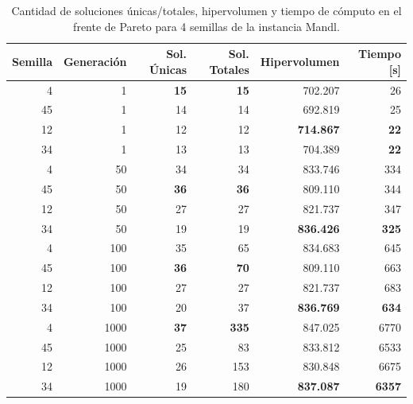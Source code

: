 \begin{table}[!htb]
\centering
\begin{tabular}{|r|r|r|r|r|r|}
\hline
Semilla & Generación & Sol. Únicas & Sol. Totales & Hipervolumen & Tiempo [s]\\ 
\hline \hline
4 & 1 & \textbf{15} & \textbf{15} & 702.207 & 26 \\ \hline
45 & 1 & 14 & 14 & 692.819 & 25 \\ \hline
12 & 1 & 12 & 12 & \textbf{714.867} & \textbf{22} \\ \hline
34 & 1 & 13 & 13 & 704.389 & \textbf{22} \\ \hline \hline
4 & 50 & 34 & 34 & 833.746 & 334 \\ \hline
45 & 50 & \textbf{36} & \textbf{36} & 809.110 & 344 \\ \hline
12 & 50 & 27 & 27 & 821.737 & 347 \\ \hline
34 & 50 & 19 & 19 & \textbf{836.426} & \textbf{325} \\ \hline\hline
4 & 100 & 35 & 65 & 834.683 & 645 \\ \hline
45 & 100 & \textbf{36} & \textbf{70} & 809.110 & 663 \\ \hline
12 & 100 & 27 & 27 & 821.737 & 683 \\ \hline
34 & 100 & 20 & 37 & \textbf{836.769} & \textbf{634} \\ \hline \hline
4 & 1000 & \textbf{37} & \textbf{335} & 847.025 & 6770 \\ \hline
45 & 1000 & 25 & 83 & 833.812 & 6533 \\ \hline
12 & 1000 & 26 & 153 & 830.848 & 6675 \\ \hline
34 & 1000 & 19 & 180 & \textbf{837.087} & \textbf{6357} \\ \hline
\end{tabular}
\caption{Cantidad de soluciones únicas/totales, hipervolumen y tiempo de cómputo en el frente de Pareto para 4 semillas de la instancia Mandl.}
\label{tab:dataFrenteMandl}
\vspace{0.5cm}

\end{table}

